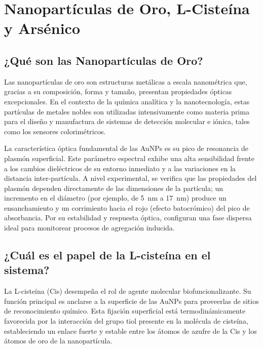 \section{Nanopartículas de Oro, L-Cisteína y Arsénico}

\subsection{¿Qué son las Nanopartículas de Oro?}

Las nanopartículas de oro son estructuras metálicas a escala nanométrica que,
gracias a su composición, forma y tamaño, presentan propiedades ópticas
excepcionales. En el contexto de la química analítica y la nanotecnología,
estas partículas de metales nobles son utilizadas intensivamente como materia
prima para el diseño y manufactura de sistemas de detección molecular e iónica,
tales como los sensores colorimétricos.

La característica óptica fundamental de las AuNPs es su pico de resonancia de
plasmón superficial. Este parámetro espectral exhibe una alta sensibilidad
frente a los cambios dieléctricos de su entorno inmediato y a las variaciones
en la distancia inter-partícula. A nivel experimental, se verifica que las
propiedades del plasmón dependen directamente de las dimensiones de la
partícula; un incremento en el diámetro (por ejemplo, de \qty{5}{\nano\metre} a
\qty{17}{\nano\metre}) produce un ensanchamiento y un corrimiento hacia el rojo
(efecto batocrómico) del pico de absorbancia. Por su estabilidad y respuesta
óptica, configuran una fase dispersa ideal para monitorear procesos de
agregación inducida.

\subsection{¿Cuál es el papel de la L-cisteína en el sistema?}

La L-cisteína (Cis) desempeña el rol de agente molecular biofuncionalizante. Su
función principal es anclarse a la superficie de las AuNPs para proveerlas de
sitios de reconocimiento químico. Esta fijación superficial está
termodinámicamente favorecida por la interacción del grupo tiol presente en la
molécula de cisteína, estableciendo un enlace fuerte y estable entre los átomos
de azufre de la Cis y los átomos de oro de la nanopartícula.

